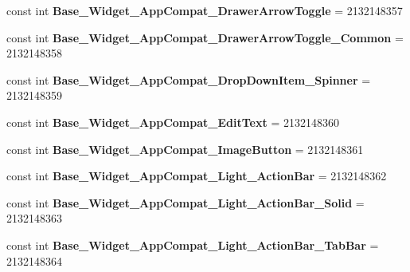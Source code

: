\begin{DoxyCompactItemize}
\item 
\mbox{\label{classst_delivery_1_1_resource_1_1_style_afb9191ebf1ff38fd36cca928eed3c2e0}} 
const int {\bfseries Base\+\_\+\+Widget\+\_\+\+App\+Compat\+\_\+\+Drawer\+Arrow\+Toggle} = 2132148357
\item 
\mbox{\label{classst_delivery_1_1_resource_1_1_style_a42b39a05dfd0f9757cb46048738081c0}} 
const int {\bfseries Base\+\_\+\+Widget\+\_\+\+App\+Compat\+\_\+\+Drawer\+Arrow\+Toggle\+\_\+\+Common} = 2132148358
\item 
\mbox{\label{classst_delivery_1_1_resource_1_1_style_a64a370eed49d4ae0a6856e1424fd0f2b}} 
const int {\bfseries Base\+\_\+\+Widget\+\_\+\+App\+Compat\+\_\+\+Drop\+Down\+Item\+\_\+\+Spinner} = 2132148359
\item 
\mbox{\label{classst_delivery_1_1_resource_1_1_style_a99d8b954598ad23d8c7b8470f0c486d7}} 
const int {\bfseries Base\+\_\+\+Widget\+\_\+\+App\+Compat\+\_\+\+Edit\+Text} = 2132148360
\item 
\mbox{\label{classst_delivery_1_1_resource_1_1_style_af2bfc87b40d3ab7837cd26440e5e1d36}} 
const int {\bfseries Base\+\_\+\+Widget\+\_\+\+App\+Compat\+\_\+\+Image\+Button} = 2132148361
\item 
\mbox{\label{classst_delivery_1_1_resource_1_1_style_af4098ef2ac50902e9c760575d19293f4}} 
const int {\bfseries Base\+\_\+\+Widget\+\_\+\+App\+Compat\+\_\+\+Light\+\_\+\+Action\+Bar} = 2132148362
\item 
\mbox{\label{classst_delivery_1_1_resource_1_1_style_a28f9ceff1ac80537d038dd9c6743cf8e}} 
const int {\bfseries Base\+\_\+\+Widget\+\_\+\+App\+Compat\+\_\+\+Light\+\_\+\+Action\+Bar\+\_\+\+Solid} = 2132148363
\item 
\mbox{\label{classst_delivery_1_1_resource_1_1_style_ad3e9bca078064e3a303b78fb73728d47}} 
const int {\bfseries Base\+\_\+\+Widget\+\_\+\+App\+Compat\+\_\+\+Light\+\_\+\+Action\+Bar\+\_\+\+Tab\+Bar} = 2132148364

\end{DoxyCompactItemize}
